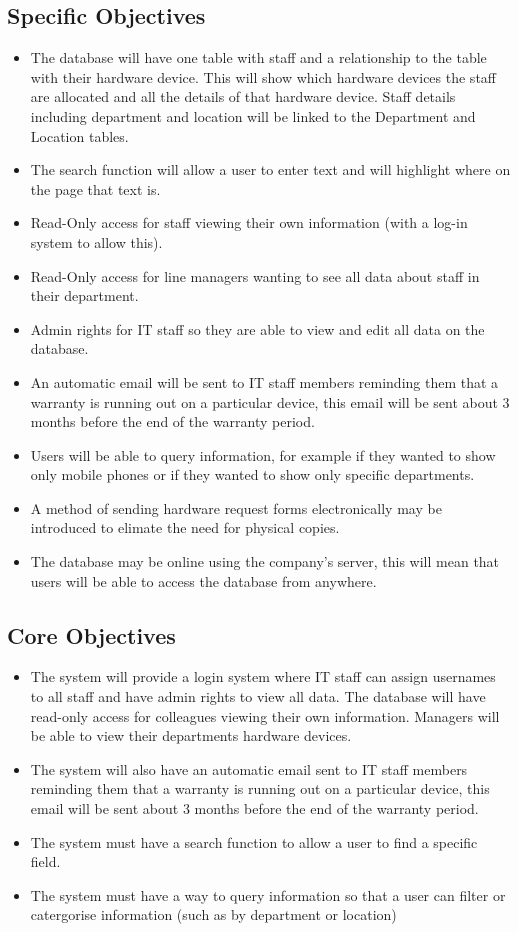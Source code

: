 \subsection{Specific Objectives}

\begin{itemize}
\item The database will have one table with staff and a relationship to the table with their hardware device. This will show which hardware devices the staff are allocated and all the details of that hardware device. Staff details including department and location will be linked to the Department and Location tables.
\item The search function will allow a user to enter text and will highlight where on the page that text is.
\item Read-Only access for staff viewing their own information (with a log-in system to allow this).
\item Read-Only access for line managers wanting to see all data about staff in their department.
\item Admin rights for IT staff so they are able to view and edit all data on the database.
\item  An automatic email will be sent to IT staff members reminding them that a warranty is running out on a particular device, this email will be sent about 3 months before the end of the warranty period.
\item Users will be able to query information, for example if they wanted to show only mobile phones or if they wanted to show only specific departments.
\item A method of sending hardware request forms electronically may be introduced to elimate the need for physical copies.
\item The database may be online using the company's server, this will mean that users will be able to access the database from anywhere.
\end{itemize}

\subsection{Core Objectives}
\begin{itemize}
\item The system will provide a login system where IT staff can assign usernames to all staff and have admin rights to view all data. The database will have read-only access for colleagues viewing their own information. Managers will be able to view their departments hardware devices.
\item The system will also have an automatic email sent to IT staff members reminding them that a warranty is running out on a particular device, this email will be sent about 3 months before the end of the warranty period.
\item The system must have a search function to allow a user to find a specific field.
\item The system must have a way to query information so that a user can filter or catergorise information (such as by department or location)
\end{itemize}


